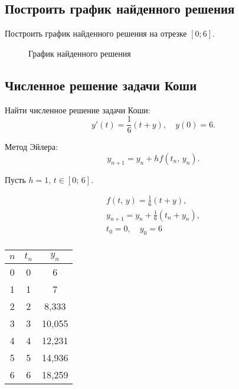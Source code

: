 \documentclass[10pt, a4paper, titlepage]{article}
\begin{document}
\subsection*{Построить график найденного решения}

Построить график найденного решения на отрезке $[0; 6]$.

\begin{figure}[H]
    \centering
    \caption{График найденного решения}
\end{figure}

\subsection*{Численное решение задачи Коши}

Найти численное решение задачи Коши: 
$$y'(t)=\frac{1}{6}(t+y), \quad y(0)=6 .$$

Метод Эйлера:
$$y_{n+1}=y_n+hf(t_n,\,y_n) .$$

Пусть $h=1$, $t\in[0;\,6]$.

\begin{gather*}
    f(t,\,y)=\frac{1}{6}(t+y) ,\\
    y_{n+1}=y_n+\frac{1}{6}(t_n+y_n) ,\\
    t_0=0 , \quad y_0=6 \\
\end{gather*}

\begin{center}
    \begin{tabular}{|c|c|c|}
        \hline
        $n$ & $t_n$ & $y_n$ \\ \hline
        0 & 0 & 6 \\ \hline
        1 & 1 & 7 \\ \hline
        2 & 2 & 8,333 \\ \hline
        3 & 3 & 10,055 \\ \hline
        4 & 4 & 12,231 \\ \hline
        5 & 5 & 14,936 \\ \hline
        6 & 6 & 18,259 \\ \hline
    \end{tabular}
\end{center}
\end{document}
